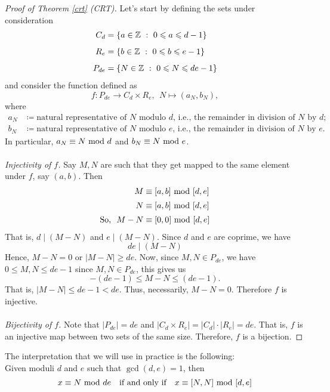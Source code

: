 \begin{proof}[Proof of Theorem \ref{crt} (CRT)] 
Let's start by defining the sets under consideration
\begin{align*}
C_d &= \left\{a\in\mathbb Z\ :\ 0\leqslant a \leqslant d-1\right\}\\[0.5em]
R_e &= \left\{b\in \mathbb Z\ :\ 0\leqslant b \leqslant e-1\right\}\\[0.5em]
P_{de} &= \left\{N\in \mathbb Z\ :\ 0\leqslant N \leqslant de-1\right\}
\end{align*}
and consider the function defined as
\[f:P_{de} \to C_d \times R_e,\ \ N \mapsto (a_N,b_N),\]
where
\begin{align*}
a_N &\coloneqq \text{natural representative of $N$ modulo $d$, i.e., the remainder in division of $N$ by $d$;}\\[0.2em]
b_N &\coloneqq  \text{natural representative of $N$ modulo $e$, i.e., the remainder in division of $N$ by $e$.}
\end{align*}
In particular, $a_N \equiv N \text{ mod }{d}$ and $b_N \equiv N \text{ mod }{e}$.\\
\\
\emph{Injectivity of $f$.} Say $M, N$ are such that they get mapped to the same element under $f$, say $(a,b)$. Then
\begin{align*}
M &\equiv [a,b]\text{ mod }{[d,e]}\\[0.2em]
N &\equiv [a,b]\text{ mod }{[d,e]}\\[0.2em]
\text{So, }\ M-N&\equiv [0,0]\text{ mod }{[d,e]}
\end{align*}
That is, $d\mid (M-N)$ and $e\mid (M-N)$. Since $d$ and $e$ are coprime, we have
\[de \mid (M-N)\]
Hence, $M - N = 0$ or $|M-N| \geq de$. Now, since $M,N \in P_{de}$, we have $0 \leq M,N \leq de-1$ since $M,N \in P_{de}$, this gives us
\[-(de - 1) \leq M-N \leq (de - 1).\]
That is, $|M - N| \leq de - 1 < de$. Thus, necessarily, $M - N = 0$. Therefore $f$ is injective.\\
\\
\emph{Bijectivity of $f$.} Note that $|P_{de}| = de$ and $|C_d \times R_e| = |C_d|\cdot |R_e| = de$. That is, $f$ is an injective map between two sets of the same size. Therefore, $f$ is a bijection. 
\end{proof}

\vspace*{1.5em}

\begin{remark}\label{crtprac}
The interpretation that we will use in practice is the following:\\[0.5em]
Given moduli $d$ and $e$ such that $\gcd(d,e) = 1$, then
\[x \equiv N \text{ mod }{de}\quad \text{if and only if}\quad x \equiv [N,N]\text{ mod }{[d,e]}\]
\end{remark}

